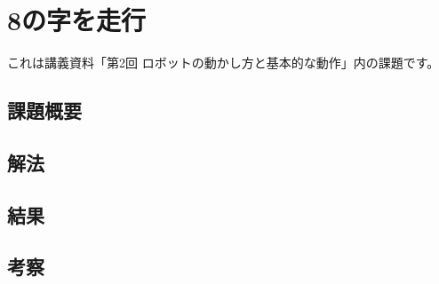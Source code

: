 \documentclass[main]{subfiles}
\begin{document}
\chapter{8の字を走行}

これは講義資料「第2回 ロボットの動かし方と基本的な動作」内の課題です。

\section{課題概要}
\section{解法}
\section{結果}
\section{考察}
\end{document}
